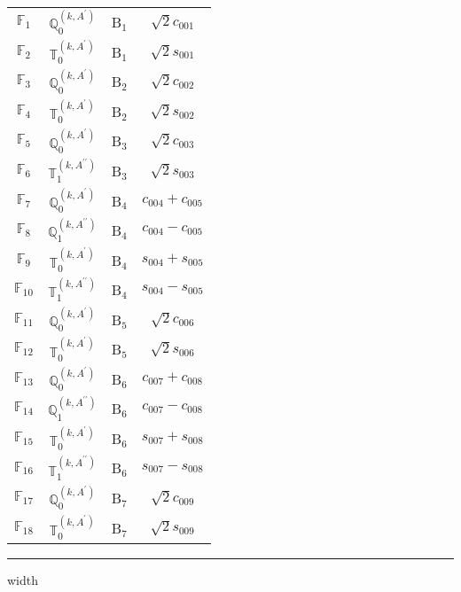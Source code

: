 \documentclass[fleqn,10pt,landscape]{article}
\begin{document}
\begin{itemize}
\begin{center}
\begin{longtable}{c|c|c|c}
$ \mathbb{F}_{1} $ & $\mathbb{Q}_{0}^{(k,A^{\prime})}$ & B$_{1}$ & $\sqrt{2} c_{001}$ \\
$ \mathbb{F}_{2} $ & $\mathbb{T}_{0}^{(k,A^{\prime})}$ & B$_{1}$ & $\sqrt{2} s_{001}$ \\ \hline
$ \mathbb{F}_{3} $ & $\mathbb{Q}_{0}^{(k,A^{\prime})}$ & B$_{2}$ & $\sqrt{2} c_{002}$ \\
$ \mathbb{F}_{4} $ & $\mathbb{T}_{0}^{(k,A^{\prime})}$ & B$_{2}$ & $\sqrt{2} s_{002}$ \\ \hline
$ \mathbb{F}_{5} $ & $\mathbb{Q}_{0}^{(k,A^{\prime})}$ & B$_{3}$ & $\sqrt{2} c_{003}$ \\
$ \mathbb{F}_{6} $ & $\mathbb{T}_{1}^{(k,A^{\prime\prime})}$ & B$_{3}$ & $\sqrt{2} s_{003}$ \\ \hline
$ \mathbb{F}_{7} $ & $\mathbb{Q}_{0}^{(k,A^{\prime})}$ & B$_{4}$ & $c_{004} + c_{005}$ \\
$ \mathbb{F}_{8} $ & $\mathbb{Q}_{1}^{(k,A^{\prime\prime})}$ & B$_{4}$ & $c_{004} - c_{005}$ \\
$ \mathbb{F}_{9} $ & $\mathbb{T}_{0}^{(k,A^{\prime})}$ & B$_{4}$ & $s_{004} + s_{005}$ \\
$ \mathbb{F}_{10} $ & $\mathbb{T}_{1}^{(k,A^{\prime\prime})}$ & B$_{4}$ & $s_{004} - s_{005}$ \\ \hline
$ \mathbb{F}_{11} $ & $\mathbb{Q}_{0}^{(k,A^{\prime})}$ & B$_{5}$ & $\sqrt{2} c_{006}$ \\
$ \mathbb{F}_{12} $ & $\mathbb{T}_{0}^{(k,A^{\prime})}$ & B$_{5}$ & $\sqrt{2} s_{006}$ \\ \hline
$ \mathbb{F}_{13} $ & $\mathbb{Q}_{0}^{(k,A^{\prime})}$ & B$_{6}$ & $c_{007} + c_{008}$ \\
$ \mathbb{F}_{14} $ & $\mathbb{Q}_{1}^{(k,A^{\prime\prime})}$ & B$_{6}$ & $c_{007} - c_{008}$ \\
$ \mathbb{F}_{15} $ & $\mathbb{T}_{0}^{(k,A^{\prime})}$ & B$_{6}$ & $s_{007} + s_{008}$ \\
$ \mathbb{F}_{16} $ & $\mathbb{T}_{1}^{(k,A^{\prime\prime})}$ & B$_{6}$ & $s_{007} - s_{008}$ \\ \hline
$ \mathbb{F}_{17} $ & $\mathbb{Q}_{0}^{(k,A^{\prime})}$ & B$_{7}$ & $\sqrt{2} c_{009}$ \\
$ \mathbb{F}_{18} $ & $\mathbb{T}_{0}^{(k,A^{\prime})}$ & B$_{7}$ & $\sqrt{2} s_{009}$ \\
\end{longtable}
\end{center}

 \hfil \hrule height 1mm width \textwidth \hfil


\end{itemize}
\end{document}
